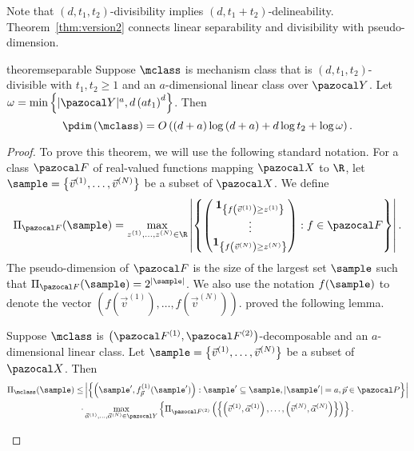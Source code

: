 Note that $\left(d,t_1,t_2\right)$-divisibility implies $\left(d,t_1+t_2\right)$-delineability. Theorem~\ref{thm:version2} connects linear separability and divisibility with pseudo-dimension.

\begin{restatable}{theorem}{separable}\label{thm:version2}
Suppose $\mclass$ is mechanism class that is $\left(d,t_1, t_2\right)$-divisible with $t_1, t_2 \geq 1$ and an $a$-dimensional linear class over $\range$. Let $\omega = \min\left\{|\range|^a, d\left(at_1\right)^d\right\}$. Then \[\pdim\left(\mclass\right) = O\left(\left(d+a\right)\log\left(d+a\right) + d\log t_2 + \log \omega\right).\]
\end{restatable}

\begin{proof}
To prove this theorem, we will use the following standard notation. For a class $\fclass$ of real-valued functions mapping $\domain$ to $\R$, let $\sample = \left\{\vec{v}^{(1)}, \dots, \vec{v}^{(N)}\right\}$ be a subset of $\domain$. We define
\[\Pi_{\fclass}(\sample) = \max_{z^{(1)}, \dots, z^{(N)} \in \R} \left|\left\{\begin{pmatrix}
\textbf{1}_{\left\{f\left(\vec{v}^{(1)}\right) \geq z^{(1)}\right\}}\\
\vdots\\
\textbf{1}_{\left\{f\left(\vec{v}^{(N)}\right) \geq z^{(N)}\right\}}
\end{pmatrix} : f \in \fclass\right\}\right|.\]
The pseudo-dimension of $\fclass$ is the size of the largest set $\sample$ such that $\Pi_{\fclass}(\sample) = 2^{|\sample|}$. We also use the notation $f(\sample)$ to denote the vector $\left(f(\vec{v}^{(1)}), \dots, f(\vec{v}^{(N)})\right)$. \citet{Morgenstern16:Learning} proved the following lemma.

\begin{lemma}\label{lem:MRshatter}
Suppose $\mclass$ is $\left(\fclass^{(1)}, \fclass^{(2)}\right)$-decomposable and an $a$-dimensional linear class. Let $\sample = \left\{\vec{v}^{(1)}, \dots, \vec{v}^{(N)}\right\}$ be a subset of $\domain$. Then \begin{align*}\Pi_{\mclass}(\sample) \leq &\left|\left\{\left(\sample', f^{(1)}_{\vec{p}}(\sample')\right) : \sample' \subseteq \sample, |\sample'| = a, \vec{p} \in \pspace \right\}\right|\\
\cdot &\max_{\vec{\alpha}^{(1)}, \dots, \vec{\alpha}^{(N)} \in \range} \left\{ \Pi_{\fclass^{(2)}} \left(\left\{ \left(\vec{v}^{(1)}, \vec{\alpha}^{(1)}\right), \dots, \left(\vec{v}^{(N)}, \vec{\alpha}^{(N)}\right)\right\}\right)\right\}.\end{align*}
\end{lemma}


\end{proof}
